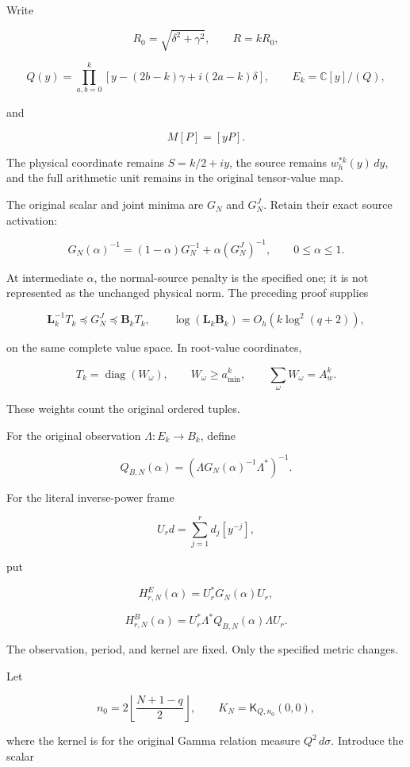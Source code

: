 \documentclass[11pt]{article}
\begin{document}
Write

\[
R_0=\sqrt{\delta^2+\gamma^2},\qquad R=kR_0,
\]

\[
Q(y)=
\prod_{a,b=0}^{k}
[y-(2b-k)\gamma+i(2a-k)\delta],
\qquad
E_k=\mathbb C[y]/(Q),
\]

and

\[
M[P]=[yP].
\]

The physical coordinate remains \(S=k/2+iy\), the source remains \(w_h^{*k}(y)\,dy\), and the full arithmetic unit remains in the original tensor-value map.

The original scalar and joint minima are \(G_N\) and \(G_N^J\). Retain their exact source activation:

\[
\boxed{
G_N(\alpha)^{-1}
=(1-\alpha)G_N^{-1}
+\alpha(G_N^J)^{-1},
\qquad 0\le\alpha\le1.
}
\tag{5}
\]

At intermediate \(\alpha\), the normal-source penalty is the specified one; it is not represented as the unchanged physical norm. The preceding proof supplies

\[
\mathbf L_k^{-1}T_k\preceq G_N^J\preceq\mathbf B_kT_k,
\qquad
\log(\mathbf L_k\mathbf B_k)
=O_h(k\log^2(q+2)),
\tag{6}
\]

on the same complete value space. In root-value coordinates,

\[
T_k=\operatorname{diag}(W_\omega),
\qquad
W_\omega\ge a_{\min}^k,
\qquad
\sum_\omega W_\omega=A_w^k.
\]

These weights count the original ordered tuples.

For the original observation \(\Lambda:E_k\to B_k\), define

\[
Q_{B,N}(\alpha)
=
\left(\Lambda G_N(\alpha)^{-1}\Lambda^*\right)^{-1}.
\]

For the literal inverse-power frame

\[
U_rd=\sum_{j=1}^{r}d_j[y^{-j}],
\]

put

\[
H^E_{r,N}(\alpha)=U_r^*G_N(\alpha)U_r,
\]

\[
H^B_{r,N}(\alpha)
=
U_r^*\Lambda^*Q_{B,N}(\alpha)\Lambda U_r.
\tag{7}
\]

The observation, period, and kernel are fixed. Only the specified metric changes.

Let

\[
n_0=2\left\lfloor\frac{N+1-q}{2}\right\rfloor,
\qquad
K_N=\mathsf K_{Q,n_0}(0,0),
\]

where the kernel is for the original Gamma relation measure \(Q^2\,d\sigma\). Introduce the scalar
\end{document}
